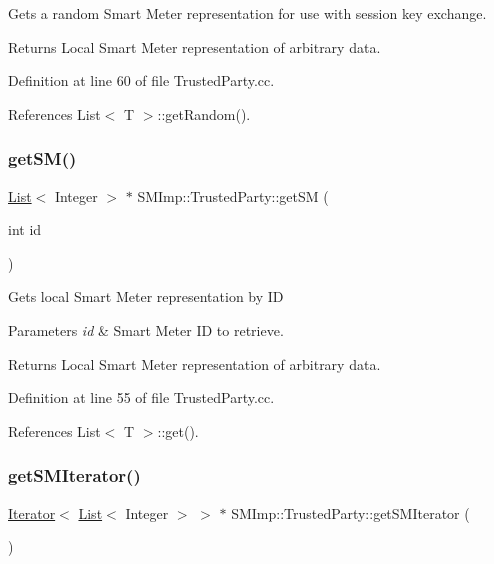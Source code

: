 Gets a random Smart Meter representation for use with session key exchange. \begin{DoxyReturn}{Returns}
Local Smart Meter representation of arbitrary data. 
\end{DoxyReturn}


Definition at line 60 of file Trusted\+Party.\+cc.



References List$<$ T $>$\+::get\+Random().

\mbox{\label{classSMImp_1_1TrustedParty_a979f9046e92d8be8fd97b1f3bc92dcd0}} 
\subsubsection{\texorpdfstring{get\+S\+M()}{getSM()}}
{\footnotesize\ttfamily \hyperlink{classList}{List}$<$ Integer $>$ $\ast$ S\+M\+Imp\+::\+Trusted\+Party\+::get\+SM (\begin{DoxyParamCaption}\item[{int}]{id }\end{DoxyParamCaption})}

Gets local Smart Meter representation by ID 
\begin{DoxyParams}{Parameters}
{\em id} & Smart Meter ID to retrieve. \\
\hline
\end{DoxyParams}
\begin{DoxyReturn}{Returns}
Local Smart Meter representation of arbitrary data. 
\end{DoxyReturn}


Definition at line 55 of file Trusted\+Party.\+cc.



References List$<$ T $>$\+::get().

\mbox{\label{classSMImp_1_1TrustedParty_a01cbd1bd12aaca134b0730bd2a6eb933}} 
\subsubsection{\texorpdfstring{get\+S\+M\+Iterator()}{getSMIterator()}}
{\footnotesize\ttfamily \hyperlink{classIterator}{Iterator}$<$ \hyperlink{classList}{List}$<$ Integer $>$ $>$ $\ast$ S\+M\+Imp\+::\+Trusted\+Party\+::get\+S\+M\+Iterator (\begin{DoxyParamCaption}{ }\end{DoxyParamCaption})}

